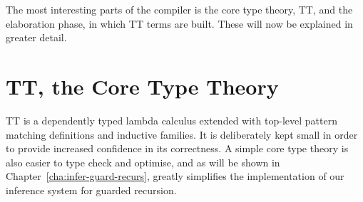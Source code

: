 
The most interesting parts of the compiler is the core type theory, TT, and the
elaboration phase, in which TT terms are built. These will now be explained in
greater detail.

\section{TT, the Core Type Theory}
TT is a dependently typed lambda calculus extended with top-level pattern
matching definitions and inductive families. It is deliberately kept small in order to provide increased
confidence in its correctness. A simple core type theory is also easier to
type check and optimise, and as will be shown in
Chapter~\ref{cha:infer-guard-recurs}, greatly simplifies the implementation of
our inference system for guarded recursion.

